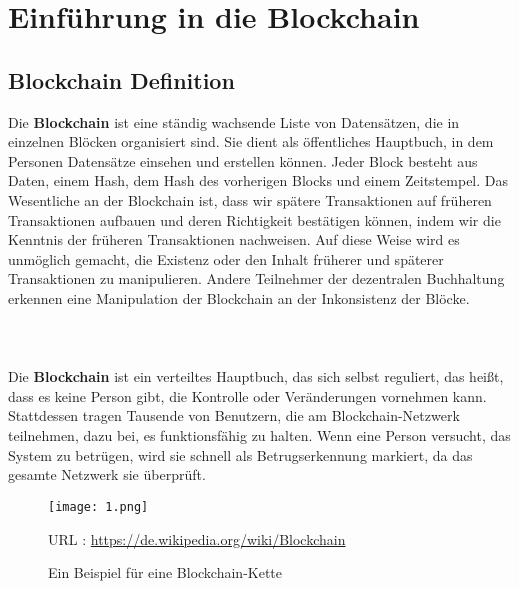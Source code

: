 \documentclass[ngerman]{scrreprt}
\begin{document}
\chapter{Einführung in die Blockchain}

\section{Blockchain Definition}\label{blockchain:definition}
Die \textbf{Blockchain} ist eine ständig wachsende Liste von Datensätzen, die in einzelnen Blöcken organisiert sind. Sie dient als öffentliches Hauptbuch, in dem Personen Datensätze einsehen und erstellen können. Jeder Block besteht aus Daten, einem Hash, dem Hash des vorherigen Blocks und einem Zeitstempel. Das Wesentliche an der Blockchain ist, dass wir spätere Transaktionen auf früheren Transaktionen aufbauen und deren Richtigkeit bestätigen können, indem wir die Kenntnis der früheren Transaktionen nachweisen. Auf diese Weise wird es unmöglich gemacht, die Existenz oder den Inhalt früherer und späterer Transaktionen zu manipulieren. Andere Teilnehmer der dezentralen Buchhaltung erkennen eine Manipulation der Blockchain an der Inkonsistenz der Blöcke. \cite{businessinsider}\\ 
\\
\\
\\
Die \textbf{Blockchain} ist ein verteiltes Hauptbuch, das sich selbst reguliert, das heißt, dass es keine Person gibt, die Kontrolle oder Veränderungen vornehmen kann. Stattdessen tragen Tausende von Benutzern, die am Blockchain-Netzwerk teilnehmen, dazu bei, es funktionsfähig zu halten. Wenn eine Person versucht, das System zu betrügen, wird sie schnell als Betrugserkennung markiert, da das gesamte Netzwerk sie überprüft. \cite{iotforall_2022}

\begin{figure}[h!]
	\centering
	\texttt{[image: 1.png]}
	\caption{Ein Beispiel für eine Blockchain-Kette}
	\small URL : \url{https://de.wikipedia.org/wiki/Blockchain}
\end{figure} 
\end{document}
